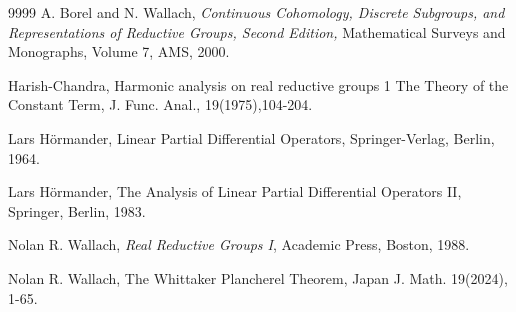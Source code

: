 \documentclass[12pt]{article}%
\begin{document}
\begin{thebibliography}{9999}                                                                                             %
A. Borel and N. Wallach, \textit{Continuous Cohomology,
Discrete Subgroups, and Representations of Reductive Groups, Second Edition,}
Mathematical Surveys and Monographs, Volume 7, AMS, 2000.

Harish-Chandra, Harmonic analysis on real reductive
groups 1 The Theory of the Constant Term, J. Func. Anal., 19(1975),104-204.

Lars H\"{o}rmander, Linear Partial Differential Operators,
Springer-Verlag, Berlin, 1964.

Lars H\"{o}rmander, The Analysis of Linear Partial
Differential Operators II, Springer, Berlin, 1983.

Nolan R. Wallach, \textit{Real Reductive Groups I},
Academic Press, Boston, 1988.

Nolan R. Wallach, The Whittaker Plancherel Theorem, Japan J.
Math. 19(2024), 1-65.
\end{thebibliography}
\end{document}
